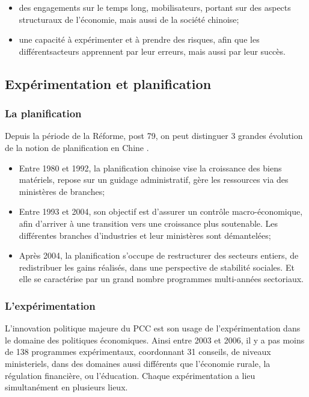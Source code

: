 \documentclass[a4paper]{article}
\begin{document}
\begin{itemize}
\item des engagements sur le temps long, mobilisateurs, portant sur des aspects structuraux de l’économie, mais aussi de la société chinoise;
\item une capacité à expérimenter et à prendre des risques, afin que les différentsacteurs apprennent par leur erreurs, mais aussi par leur succès.
\end{itemize}

\subsection{Expérimentation et planification}
\label{sec:org4828e82}
\subsubsection{La planification}
\label{sec:org7c0e0d7}
Depuis la période de la Réforme, post 79, on peut distinguer 3 grandes évolution de la notion de planification en Chine \cite{heilmann18_red}.

\begin{itemize}
\item Entre 1980 et 1992, la planification chinoise vise la croissance des biens matériels, repose sur un guidage administratif, gère les ressources via des ministères de branches;
\item Entre 1993 et 2004, son objectif est d’assurer un contrôle macro-éco\-no\-mi\-que, afin d’arriver à une transition vers une croissance plus soutenable. Les différentes branches d’industries et leur ministères sont démantelées;
\item Après 2004, la planification s’occupe de restructurer des secteurs entiers, de redistribuer les gains réalisés, dans une perspective de stabilité sociales. Et elle se caractérise par un grand nombre programmes multi-années sectoriaux.
\end{itemize}
\subsubsection{L’expérimentation}
\label{sec:orgcd915f5}
L’innovation politique majeure du PCC est son usage de l’expérimentation dans le domaine des politiques économiques. Ainsi entre 2003 et 2006, il y a pas moins de 138 programmes expérimentaux, coordonnant 31 conseils, de niveaux ministeriels, dans des domaines aussi différents que l’économie rurale, la régulation financière, ou l’éducation. Chaque expérimentation a lieu simultanément en plusieurs lieux.
\end{document}
